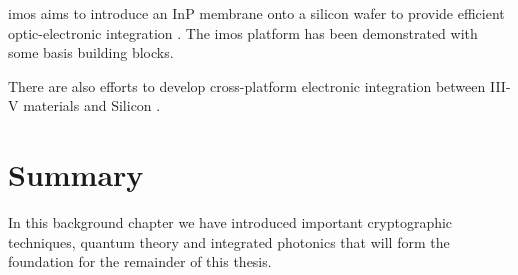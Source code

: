 \Ac{imos} aims to introduce an \ac{InP} membrane onto a silicon wafer to provide efficient optic-electronic integration \cite{jeppix, IMOS}. The \ac{imos} platform has been demonstrated with some basis building blocks.

There are also efforts to develop cross-platform electronic integration between III-V materials and Silicon \cite{}. 

\section{Summary}

In this background chapter we have introduced important cryptographic techniques, quantum theory and integrated photonics that will form the foundation for the remainder of this thesis.

